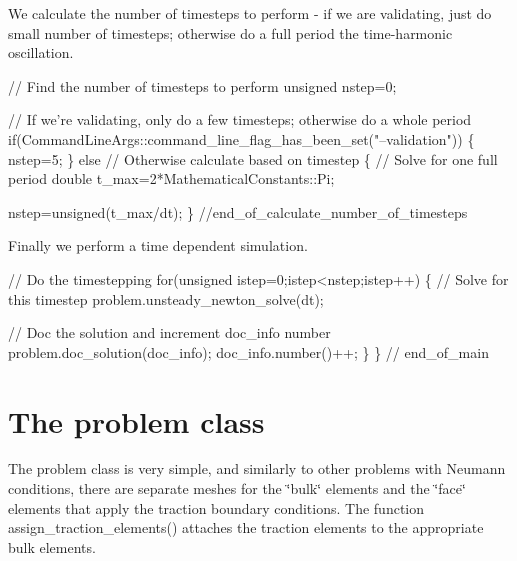 We calculate the number of timesteps to perform -\/ if we are validating, just do small number of timesteps; otherwise do a full period the time-\/harmonic oscillation.


\begin{DoxyCodeInclude}
 \textcolor{comment}{// Find the number of timesteps to perform}
 \textcolor{keywordtype}{unsigned} nstep=0;

 \textcolor{comment}{// If we're validating, only do a few timesteps; otherwise do a whole period}
 \textcolor{keywordflow}{if}(CommandLineArgs::command\_line\_flag\_has\_been\_set(\textcolor{stringliteral}{"--validation"}))
  \{
   nstep=5;
  \}
 \textcolor{keywordflow}{else} \textcolor{comment}{// Otherwise calculate based on timestep}
  \{
   \textcolor{comment}{// Solve for one full period}
   \textcolor{keywordtype}{double} t\_max=2*MathematicalConstants::Pi;

   nstep=unsigned(t\_max/dt);
  \} \textcolor{comment}{//end\_of\_calculate\_number\_of\_timesteps}

\end{DoxyCodeInclude}


Finally we perform a time dependent simulation.


\begin{DoxyCodeInclude}
 \textcolor{comment}{// Do the timestepping}
 \textcolor{keywordflow}{for}(\textcolor{keywordtype}{unsigned} istep=0;istep<nstep;istep++)
  \{
   \textcolor{comment}{// Solve for this timestep}
   problem.unsteady\_newton\_solve(dt);

   \textcolor{comment}{// Doc the solution and increment doc\_info number}
   problem.doc\_solution(doc\_info);
   doc\_info.number()++;
  \}
\} \textcolor{comment}{// end\_of\_main}

\end{DoxyCodeInclude}




 

\hypertarget{index_problem}{}\section{The problem class}\label{index_problem}
The problem class is very simple, and similarly to other problems with Neumann conditions, there are separate meshes for the \char`\"{}bulk\char`\"{} elements and the \char`\"{}face\char`\"{} elements that apply the traction boundary conditions. The function {\ttfamily assign\+\_\+traction\+\_\+elements()} attaches the traction elements to the appropriate bulk elements.

